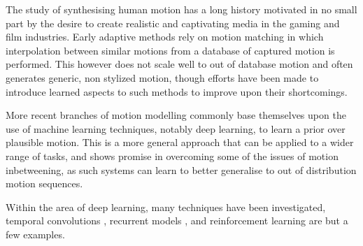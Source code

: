 The study of synthesising human motion has a long history motivated in no small part by the desire to create realistic and captivating media in the gaming and film industries. Early adaptive methods rely on motion matching \cite{early_motion_matching} \cite{clavet_motion_matching} in which interpolation between similar motions from a database of captured motion is performed. This however does not scale well to out of database motion and often generates generic, non stylized motion, though efforts have been made to introduce learned aspects to such methods \cite{holden_motion_matching} to improve upon their shortcomings.


More recent branches of motion modelling commonly base themselves upon the use of machine learning techniques, notably deep learning, to learn a prior over plausible motion. This is a more general approach that can be applied to a wider range of tasks, and shows promise in overcoming some of the issues of motion inbetweening, as such systems can learn to better generalise to out of distribution motion sequences.

Within the area of deep learning, many techniques have been investigated, temporal convolutions \cite{temporal_convolutions}, recurrent models \cite{recurrent_harvey_2020}, and reinforcement learning \cite{rl_cho} are but a few examples.
